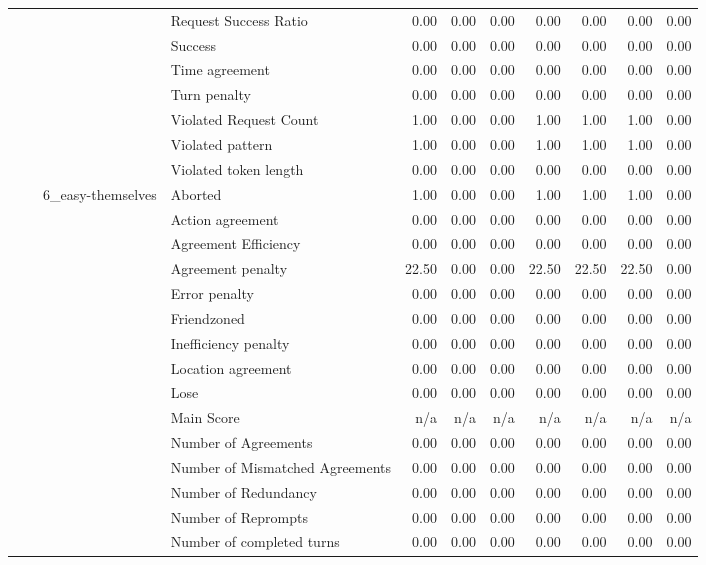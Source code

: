 \begin{tabular}{llllrrrrrrr}
 &  &  & Request Success Ratio & 0.00 & 0.00 & 0.00 & 0.00 & 0.00 & 0.00 & 0.00 \\
 &  &  & Success & 0.00 & 0.00 & 0.00 & 0.00 & 0.00 & 0.00 & 0.00 \\
 &  &  & Time agreement & 0.00 & 0.00 & 0.00 & 0.00 & 0.00 & 0.00 & 0.00 \\
 &  &  & Turn penalty & 0.00 & 0.00 & 0.00 & 0.00 & 0.00 & 0.00 & 0.00 \\
 &  &  & Violated Request Count & 1.00 & 0.00 & 0.00 & 1.00 & 1.00 & 1.00 & 0.00 \\
 &  &  & Violated pattern & 1.00 & 0.00 & 0.00 & 1.00 & 1.00 & 1.00 & 0.00 \\
 &  &  & Violated token length & 0.00 & 0.00 & 0.00 & 0.00 & 0.00 & 0.00 & 0.00 \\
\cline{3-11}
 &  & \multirow[t]{27}{*}{6_easy-themselves} & Aborted & 1.00 & 0.00 & 0.00 & 1.00 & 1.00 & 1.00 & 0.00 \\
 &  &  & Action agreement & 0.00 & 0.00 & 0.00 & 0.00 & 0.00 & 0.00 & 0.00 \\
 &  &  & Agreement Efficiency & 0.00 & 0.00 & 0.00 & 0.00 & 0.00 & 0.00 & 0.00 \\
 &  &  & Agreement penalty & 22.50 & 0.00 & 0.00 & 22.50 & 22.50 & 22.50 & 0.00 \\
 &  &  & Error penalty & 0.00 & 0.00 & 0.00 & 0.00 & 0.00 & 0.00 & 0.00 \\
 &  &  & Friendzoned & 0.00 & 0.00 & 0.00 & 0.00 & 0.00 & 0.00 & 0.00 \\
 &  &  & Inefficiency penalty & 0.00 & 0.00 & 0.00 & 0.00 & 0.00 & 0.00 & 0.00 \\
 &  &  & Location agreement & 0.00 & 0.00 & 0.00 & 0.00 & 0.00 & 0.00 & 0.00 \\
 &  &  & Lose & 0.00 & 0.00 & 0.00 & 0.00 & 0.00 & 0.00 & 0.00 \\
 &  &  & Main Score & n/a & n/a & n/a & n/a & n/a & n/a & n/a \\
 &  &  & Number of Agreements & 0.00 & 0.00 & 0.00 & 0.00 & 0.00 & 0.00 & 0.00 \\
 &  &  & Number of Mismatched Agreements & 0.00 & 0.00 & 0.00 & 0.00 & 0.00 & 0.00 & 0.00 \\
 &  &  & Number of Redundancy & 0.00 & 0.00 & 0.00 & 0.00 & 0.00 & 0.00 & 0.00 \\
 &  &  & Number of Reprompts & 0.00 & 0.00 & 0.00 & 0.00 & 0.00 & 0.00 & 0.00 \\
 &  &  & Number of completed turns & 0.00 & 0.00 & 0.00 & 0.00 & 0.00 & 0.00 & 0.00 \\

\end{tabular}
